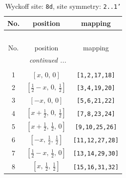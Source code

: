 \documentclass[fleqn,8pt]{jsarticle}
\begin{document}
\begin{longtable}{ccc}
\caption{Wyckoff site: {\tt 8d}, site symmetry: {\tt 2..1'}}
 \\
 \hline \hline
No. & position & mapping \\ \hline \endfirsthead

\multicolumn{2}{l}{\tablename\ \thetable{}} \\
 \hline \hline
No. & position & mapping \\ \hline \endhead

 \hline \hline
\multicolumn{2}{r}{\footnotesize\it continued ...} \\ \endfoot

 \hline \hline
\multicolumn{2}{r}{} \\ \endlastfoot

1 & $\left[ x,\, 0,\, 0 \right]$ & {\tt [1,2,17,18]} \\ \hline
2 & $\left[ \frac{1}{2} - x,\, 0,\, \frac{1}{2} \right]$ & {\tt [3,4,19,20]} \\ \hline
3 & $\left[ - x,\, 0,\, 0 \right]$ & {\tt [5,6,21,22]} \\ \hline
4 & $\left[ x + \frac{1}{2},\, 0,\, \frac{1}{2} \right]$ & {\tt [7,8,23,24]} \\ \hline
5 & $\left[ x + \frac{1}{2},\, \frac{1}{2},\, 0 \right]$ & {\tt [9,10,25,26]} \\ \hline
6 & $\left[ - x,\, \frac{1}{2},\, \frac{1}{2} \right]$ & {\tt [11,12,27,28]} \\ \hline
7 & $\left[ \frac{1}{2} - x,\, \frac{1}{2},\, 0 \right]$ & {\tt [13,14,29,30]} \\ \hline
8 & $\left[ x,\, \frac{1}{2},\, \frac{1}{2} \right]$ & {\tt [15,16,31,32]} \\
\end{longtable}
\renewcommand{\arraystretch}{1.2}
\end{document}
